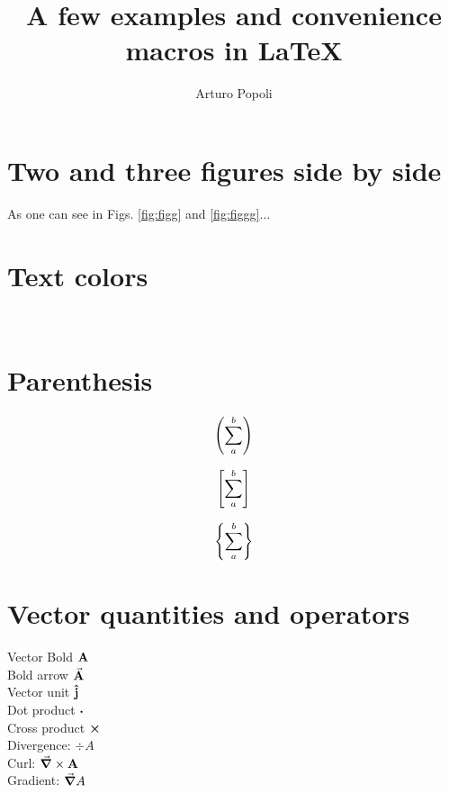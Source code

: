 \documentclass{report}
\title{A few examples and convenience macros in LaTeX}
\author{Arturo Popoli}
\begin{document}
	
	\maketitle
	
	\section{Two and three figures side by side}
	
	
	As one can see in Figs. \ref{fig:figg} and \ref{fig:figgg}$\ldots$
	
	\section{Text colors}
	 \\
	
	\section{Parenthesis}
	
	\begin{equation}\label{key}
		\left(\sum_{a}^{b}\right)
	\end{equation}

	\begin{equation}\label{key}
		\left[\sum_{a}^{b}\right]
	\end{equation}

	\begin{equation}\label{key}
		\left\lbrace \sum_{a}^{b}\right\rbrace
	\end{equation}
	
	\section{Vector quantities and operators}
	Vector Bold $ \vb{A} $ \\
	Bold arrow $ \va{A} $ \\
	Vector unit $ \vu{j} $ \\
	Dot product $ \boldsymbol\cdot $ \\
	Cross product $ \boldsymbol\times $ \\
    Divergence: $ \div{A} $ \\
    Curl: $ \curl{A} $ \\
    Gradient: $ \vec{\boldsymbol\nabla} A $ \\
 	
\end{document}
